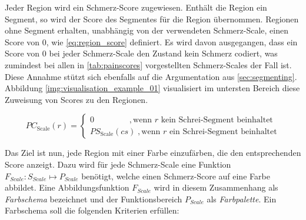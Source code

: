 Jeder Region wird ein Schmerz-Score zugewiesen. Enthält die Region ein Segment, so wird der Score des Segmentes für die Region übernommen. Regionen ohne Segment erhalten, unabhängig von der verwendeten Schmerz-Scale, einen Score von 0, wie \autoref{eq:region_score} definiert. Es wird davon ausgegangen, dass ein Score von 0 bei jeder Schmerz-Scale den Zustand \glqq kein Schmerz\grqq{} codiert, was zumindest bei allen in \autoref{tab:painscores} vorgestellten Schmerz-Scales der Fall ist. Diese Annahme stützt sich ebenfalls auf die Argumentation aus \autoref{sec:segmenting}. Abbildung \ref{img:visualisation_example_01} visualisiert im untersten Bereich diese Zuweisung von Scores zu den Regionen.

\begin{equation}
PC_{\text{Scale}}(r) = \begin{cases}
 0 \qquad \qquad \;,  \text{wenn } r  \text{ kein Schrei-Segment beinhaltet} \\
 PS_{\text{Scale}}(cs) \;, \text{wenn } r  \text{ ein Schrei-Segment beinhaltet}
 \end{cases}	
 \label{eq:region_score}
\end{equation}

Das Ziel ist nun, jede Region mit einer Farbe einzufärben, die den entsprechenden Score anzeigt. Dazu wird für jede Schmerz-Scale eine Funktion $F_{Scale}:S_{Scale} \mapsto P_{Scale}$ benötigt, welche einen Schmerz-Score auf eine Farbe abbildet. Eine Abbildungsfunktion $F_{Scale}$ wird in diesem Zusammenhang als \emph{Farbschema} bezeichnet und der Funktionsbereich $P_{Scale}$ als \emph{Farbpalette}. Ein Farbschema soll die folgenden Kriterien erfüllen:

